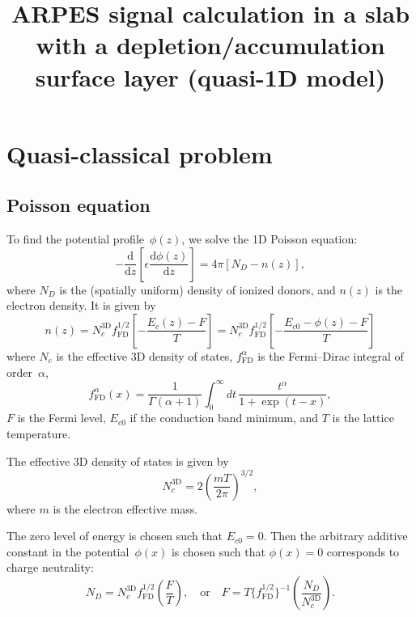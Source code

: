 \documentclass[10pt]{article}
\newcommand{\dd}{\mathrm{d}}
\newcommand{\fFD}{f_{\mathrm{FD}}}
\begin{document}
\title{ARPES signal calculation in a slab with a depletion/accumulation
surface layer (quasi-1D model)}
\maketitle

\section{Quasi-classical problem}

\subsection{Poisson equation}

To find the potential profile~$\phi(z)$, we solve the 1D Poisson equation:
\begin{equation}
	\label{eq:poisson}
	- \frac{\dd}{\dd z} \left[ \epsilon \frac{\dd\phi(z)}{\dd z} \right]
	= 4\pi [N_D - n(z)],
\end{equation}
where $N_D$ is the (spatially uniform) density of ionized donors, and $n(z)$ is the
electron density. It is given by
\begin{equation}
	\label{eq:c_density}
	n(z) = N_c^\mathrm{3D} \fFD^{1/2} \left[ -\frac{E_c(z) - F}{T} \right]
	     = N_c^\mathrm{3D} \fFD^{1/2} \left[ -\frac{E_{c0} - \phi(z) - F}{T} \right]
\end{equation}
where $N_c$ is the effective 3D density of states, $\fFD^{\alpha}$ is the Fermi--Dirac
integral of order~$\alpha$,
\begin{equation}
	\fFD^{\alpha}(x) =
	\frac{1}{\Gamma(\alpha + 1)} \int_0^\infty dt\, \frac{t^\alpha}{1 + \exp(t - x)},
\end{equation}
$F$ is the Fermi level, $E_{c0}$ if the conduction band minimum,
and $T$ is the lattice temperature.

The effective 3D density of states is given by
\begin{equation}
	N_c^\mathrm{3D} = 2 \left( \frac{m T}{2\pi} \right)^{3/2},
\end{equation}
where $m$ is the electron effective mass.

The zero level of energy is chosen such that $E_{c0} = 0$. Then the arbitrary additive
constant in the potential~$\phi(x)$ is chosen such that $\phi(x) = 0$ corresponds to
charge neutrality:
\begin{equation}
	N_D = N_c^\mathrm{3D} \fFD^{1/2} \left( \frac{F}{T} \right),
	\quad\text{or}\quad
	F = T \{\fFD^{1/2}\}^{-1} \left( \frac{N_D}{N_c^\mathrm{3D}} \right).
\end{equation}
\end{document}
